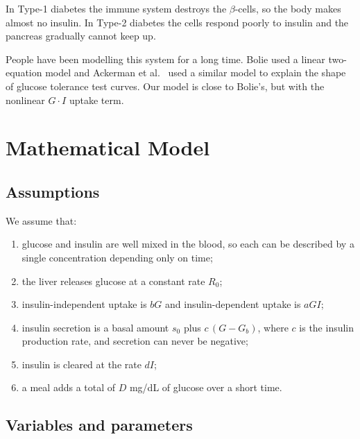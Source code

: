 \documentclass[11pt,a4paper]{article}
\newcommand{\Gb}{G_b}
\begin{document}
In Type-1 diabetes the immune system destroys the $\beta$-cells, so the body makes almost no insulin. In Type-2 diabetes the cells respond poorly to insulin and the pancreas gradually cannot keep up.

People have been modelling this system for a long time. Bolie \cite{bolie} used a linear two-equation model and Ackerman et al.\ \cite{ackerman} used a similar model to explain the shape of glucose tolerance test curves. Our model is close to Bolie's, but with the nonlinear $G\cdot I$ uptake term.

\section{Mathematical Model}\label{sec:model}

\subsection{Assumptions}
We assume that:
\begin{enumerate}
\item glucose and insulin are well mixed in the blood, so each can be described by a single concentration depending only on time;
\item the liver releases glucose at a constant rate $R_0$;
\item insulin-independent uptake is $bG$ and insulin-dependent uptake is $aGI$;
\item insulin secretion is a basal amount $s_0$ plus $c\,(G-\Gb)$, where $c$ is the insulin production rate, and secretion can never be negative;
\item insulin is cleared at the rate $dI$;
\item a meal adds a total of $D$ mg/dL of glucose over a short time.
\end{enumerate}

\subsection{Variables and parameters}
\end{document}
